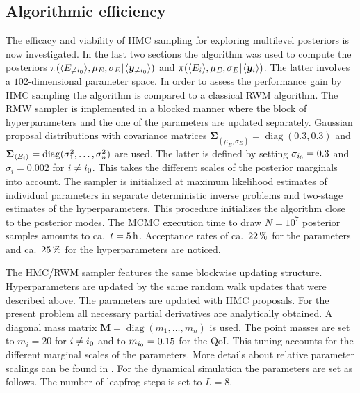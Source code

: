 \subsection{Algorithmic efficiency}
The efficacy and viability of HMC sampling for exploring multilevel posteriors is now investigated.
In the last two sections the algorithm was used to compute the posteriors
\(\pi(\langle{E_{\neq i_0}}\rangle,\mu_E,\sigma_E {\:\!}|{\:\!} \langle{\bm{y}_{\neq i_0}}\rangle)\) and \(\pi(\langle{E_i}\rangle,\mu_E,\sigma_E {\:\!}|{\:\!} \langle{\bm{y}_i}\rangle)\).
The latter involves a \(102\)-dimensional parameter space.
In order to assess the performance gain by HMC sampling the algorithm is compared to a classical RWM algorithm.
The RMW sampler is implemented in a blocked manner where the block of hyperparameters and the one of the parameters are updated separately.
Gaussian proposal distributions with covariance matrices \(\bm{\Sigma}_{(\mu_E,\sigma_E)} = \operatorname{diag}(0.3,0.3)\) and \(\bm{\Sigma}_{\langle{E_i}\rangle} = \operatorname{diag}(\sigma_1^2,\ldots,\sigma_n^2)\) are used.
The latter is defined by setting \(\sigma_{i_0} = 0.3\) and \(\sigma_i = 0.002\) for \(i \neq i_0\).
This takes the different scales of the posterior marginals into account.
The sampler is initialized at maximum likelihood estimates of individual parameters in separate deterministic inverse problems and two-stage estimates of the hyperparameters.
This procedure initializes the algorithm close to the posterior modes.
The MCMC execution time to draw \(N = 10^7\) posterior samples amounts to ca.\ \(t = \unit[5]{h}\).
Acceptance rates of ca.\ \(\unit[22]{\%}\) for the parameters and ca.\ \(\unit[25]{\%}\) for the hyperparameters are noticed.
\par %
The HMC/RWM sampler features the same blockwise updating structure.
Hyperparameters are updated by the same random walk updates that were described above.
The parameters are updated with HMC proposals.
For the present problem all necessary partial derivatives are analytically obtained.
A diagonal mass matrix \(\bm{M} = \operatorname{diag}(m_1,\ldots,m_n)\) is used.
The point masses are set to \(m_i = 20\) for \(i \neq i_0\) and to \(m_{i_0} = 0.15\) for the QoI.
This tuning accounts for the different marginal scales of the parameters.
More details about relative parameter scalings can be found in \cite{MCMC:Neal2011}.
For the dynamical simulation the parameters are set as follows.
The number of leapfrog steps is set to \(L = 8\).
